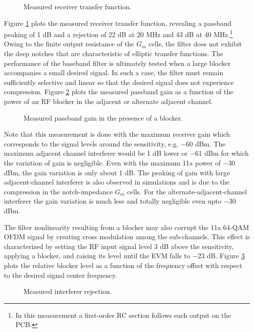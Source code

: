 \begin{figure}[htb]
\vspace{2.55in}
\caption{Measured receiver transfer function.}
\label{tf}
\end{figure}
Figure \ref{tf} plots the measured receiver transfer function, revealing a passband peaking of 1 dB and a rejection of 22 dB at 20 MHz and 43 dB at
40 MHz.\footnote{In this measurement a first-order RC section follows each output on the PCB.}
Owing to the finite output resistance of the $G_m$ cells, the filter does not exhibit the deep notches that are characteristic of elliptic transfer
functions.
The performance of the baseband filter is ultimately tested when a large blocker accompanies a small desired signal. In such a case, the filter must
remain sufficiently selective and linear so that the desired signal does not experience compression. Figure \ref{gainblocker} plots the measured
passband gain as a function of the power of an RF blocker in the adjacent or alternate adjacent channel.
\begin{figure}[htb]
\vspace{2.65in}
\caption{Measured passband gain in the presence of a blocker.}
\vspace{0.1in}
\label{gainblocker}
\end{figure}
Note that this measurement is done with the maximum receiver gain which corresponds to the signal levels around the sensitivity, e.g. $-$60 dBm. The
maximum adjacent channel interferer would be 1 dB lower or $-$61 dBm for which the variation of gain is negligible. Even with the maximum 11a power of
$-$30 dBm, the gain variation is only about 1 dB. The peaking of gain with large adjacent-channel interferer is also observed in simulations and is
due to the compression in the notch-impedance $G_m$ cells. For the alternate-adjacent-channel interferer the gain variation is much less and totally
negligible even upto $-$30 dBm. 

The filter nonlinearity resulting from a blocker may also corrupt the 11a 64-QAM OFDM signal by creating cross modulation among the sub-channels.
This effect is characterized by setting the RF input signal level 3 dB above the sensitivity, applying a blocker, and raising its level until the EVM
falls to $-$23 dB. Figure \ref{evmint} plots the relative blocker level as a function of the frequency offset with respect to the desired signal
center frequency.
\begin{figure}[htb]
\vspace{2.65in}
\caption{Measured interferer rejection.}
\vspace{0.1in}
\label{evmint}
\end{figure}

